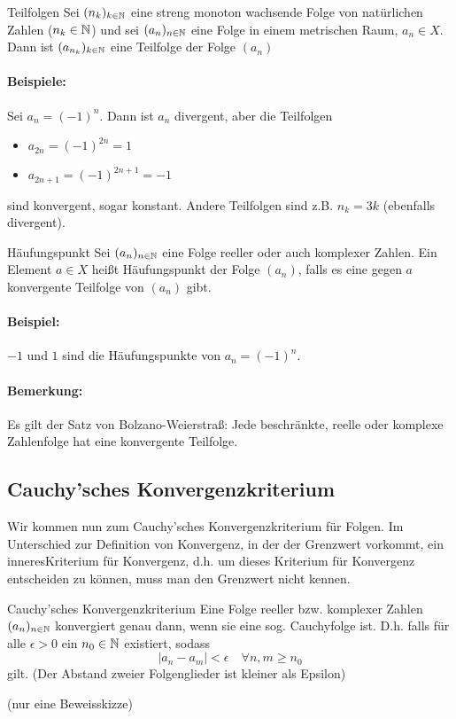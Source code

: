 \begin{definition}{Teilfolgen}
	Sei $(n_k)_{k\in\mathbb{N}}$ eine streng monoton wachsende Folge von natürlichen Zahlen ($n_k\in\mathbb{N}$) und sei $(a_n)_{n\in\mathbb{N}}$ eine Folge in einem metrischen Raum, $a_n\in X$. Dann ist $(a_{n_k})_{k\in\mathbb{N}}$ eine Teilfolge der Folge $(a_n)$
\end{definition}
\paragraph{Beispiele:}
Sei $a_n=(-1)^n$. Dann ist $a_n$ divergent, aber die Teilfolgen
\begin{itemize}
	\item $a_{2n}=(-1)^{2n}=1$
	\item $a_{2n+1}=(-1)^{2n+1}=-1$
\end{itemize}
sind konvergent, sogar konstant. Andere Teilfolgen sind z.B. $n_k=3k$ (ebenfalls divergent).

\begin{definition}{Häufungspunkt}
	Sei $(a_n)_{n\in\mathbb{N}}$ eine Folge reeller oder auch komplexer Zahlen. Ein Element $a\in X$ heißt Häufungspunkt der Folge $(a_n)$, falls es eine gegen $a$ konvergente Teilfolge von $(a_n)$ gibt.
\end{definition}
\paragraph{Beispiel:}
$-1$ und $1$ sind die Häufungspunkte von $a_n=(-1)^n$.

\paragraph{Bemerkung:}
Es gilt der Satz von Bolzano-Weierstraß: Jede beschränkte, reelle oder komplexe Zahlenfolge hat eine konvergente Teilfolge.

\subsection{Cauchy'sches Konvergenzkriterium}
Wir kommen nun zum Cauchy'sches Konvergenzkriterium für Folgen. Im Unterschied zur Definition von Konvergenz, in der der Grenzwert vorkommt, ein \glqq inneres\grqq Kriterium für Konvergenz, d.h. um dieses Kriterium für Konvergenz entscheiden zu können, muss man den Grenzwert nicht kennen.

\begin{satz}{Cauchy'sches Konvergenzkriterium}
	Eine Folge reeller bzw. komplexer Zahlen $(a_n)_{n\in\mathbb{N}}$ konvergiert genau dann, wenn sie eine sog. Cauchyfolge ist. D.h. falls für alle $\epsilon>0$ ein $n_0\in\mathbb{N}$ existiert, sodass
	\begin{equation*}
		|a_n-a_m|<\epsilon \quad\forall n,m\geq n_0
	\end{equation*}
	gilt. (Der Abstand zweier Folgenglieder ist kleiner als Epsilon)
\end{satz}
\beweis
(nur eine Beweisskizze)

